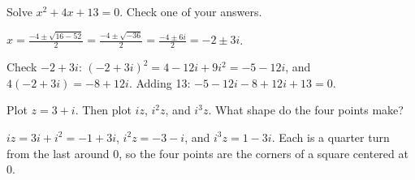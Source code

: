 \begin{Exercise}[title={Complex roots}, label=cx3]
Solve $x^2 + 4x + 13 = 0$. Check one of your answers.
\end{Exercise}
\begin{Answer}[ref=cx3]
$x = \frac{-4 \pm \sqrt{16 - 52}}{2} = \frac{-4 \pm \sqrt{-36}}{2} = \frac{-4 \pm 6i}{2} = -2 \pm 3i$.

Check $-2 + 3i$: $(-2 + 3i)^2 = 4 - 12i + 9i^2 = -5 - 12i$, and
$4(-2 + 3i) = -8 + 12i$. Adding 13: $-5 - 12i - 8 + 12i + 13 = 0$.
\end{Answer}

\begin{Exercise}[title={Quarter turns}, label=cx4]
Plot $z = 3 + i$. Then plot $iz$, $i^2z$, and $i^3z$. What shape do the
four points make?
\end{Exercise}
\begin{Answer}[ref=cx4]
$iz = 3i + i^2 = -1 + 3i$, $i^2z = -3 - i$, and $i^3z = 1 - 3i$. Each is a
quarter turn from the last around 0, so the four points are the corners of
a square centered at 0.
\end{Answer}
